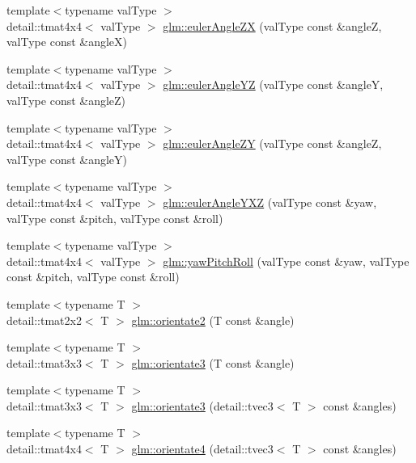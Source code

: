 \begin{DoxyCompactItemize}
\item 
{\footnotesize template$<$typename val\+Type $>$ }\\detail\+::tmat4x4$<$ val\+Type $>$ \hyperlink{group__gtx__euler__angles_ga630d8b3aadde3c890251deba896c9946}{glm\+::euler\+Angle\+Z\+X} (val\+Type const \&angle\+Z, val\+Type const \&angle\+X)
\item 
{\footnotesize template$<$typename val\+Type $>$ }\\detail\+::tmat4x4$<$ val\+Type $>$ \hyperlink{group__gtx__euler__angles_ga99f4bb03efd91aac95be4ce38a5f44ce}{glm\+::euler\+Angle\+Y\+Z} (val\+Type const \&angle\+Y, val\+Type const \&angle\+Z)
\item 
{\footnotesize template$<$typename val\+Type $>$ }\\detail\+::tmat4x4$<$ val\+Type $>$ \hyperlink{group__gtx__euler__angles_ga6fb1d08bf5eb9320eb6520e9c27f0e80}{glm\+::euler\+Angle\+Z\+Y} (val\+Type const \&angle\+Z, val\+Type const \&angle\+Y)
\item 
{\footnotesize template$<$typename val\+Type $>$ }\\detail\+::tmat4x4$<$ val\+Type $>$ \hyperlink{group__gtx__euler__angles_gab2c29b80a86caa83f6b550de31e6889f}{glm\+::euler\+Angle\+Y\+X\+Z} (val\+Type const \&yaw, val\+Type const \&pitch, val\+Type const \&roll)
\item 
{\footnotesize template$<$typename val\+Type $>$ }\\detail\+::tmat4x4$<$ val\+Type $>$ \hyperlink{group__gtx__euler__angles_ga4c297724e663cb77cc2cf7e4ab89b77e}{glm\+::yaw\+Pitch\+Roll} (val\+Type const \&yaw, val\+Type const \&pitch, val\+Type const \&roll)
\item 
{\footnotesize template$<$typename T $>$ }\\detail\+::tmat2x2$<$ T $>$ \hyperlink{group__gtx__euler__angles_ga381a4208b916cabe7244b1b77b0ea6c2}{glm\+::orientate2} (T const \&angle)
\item 
{\footnotesize template$<$typename T $>$ }\\detail\+::tmat3x3$<$ T $>$ \hyperlink{group__gtx__euler__angles_ga745f26f19b9c0e35c22e634e7f0c1721}{glm\+::orientate3} (T const \&angle)
\item 
{\footnotesize template$<$typename T $>$ }\\detail\+::tmat3x3$<$ T $>$ \hyperlink{group__gtx__euler__angles_gadfb25615afc286d77558384ae7b367d6}{glm\+::orientate3} (detail\+::tvec3$<$ T $>$ const \&angles)
\item 
{\footnotesize template$<$typename T $>$ }\\detail\+::tmat4x4$<$ T $>$ \hyperlink{group__gtx__euler__angles_gabbba69e91bb14442bb1b4d330235c550}{glm\+::orientate4} (detail\+::tvec3$<$ T $>$ const \&angles)
\end{DoxyCompactItemize}


